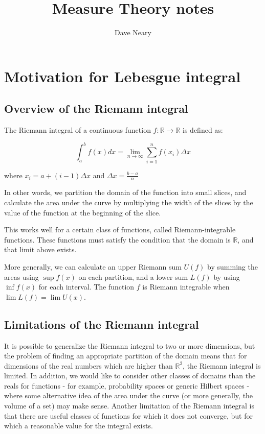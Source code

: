 \documentclass{article}
\begin{document}
\title{Measure Theory notes}
\author{Dave Neary}

\maketitle

\section{Motivation for Lebesgue integral}

\subsection{Overview of the Riemann integral}

The Riemann integral of a continuous function $f:\mathbb{R} \rightarrow \mathbb{R}$ is defined as:

\[ \int_{a}^{b}f(x) dx = \lim_{n \rightarrow \infty}\sum_{i=1}^{n}f(x_{i}) \Delta x \]
 
where $x_{i} = a + (i-1)\Delta x$ and $\Delta x=\frac{b-a}{n}$

In other words, we partition the domain of the function into small slices, 
and calculate the area under the curve by multiplying the width of the slices 
by the value of the function at the beginning of the slice.

This works well for a certain class of functions, called Riemann-integrable
functions. These functions must satisfy the condition that the domain is $\mathbb{R}$,
and that limit above exists.

More generally, we can calculate an upper Riemann sum $U(f)$ by summing the 
areas using $\sup{f(x)}$ on each partition, and a lower sum $L(f)$ by using $\inf{f(x)}$
for each interval. The function $f$ is Riemann integrable when $\lim L(f) = \lim U(x)$. 

\subsection{Limitations of the Riemann integral}

It is possible to generalize the Riemann integral to two
or more dimensions, but the problem of finding an appropriate partition of the domain
means that for dimensions of the real numbers which are higher than $\mathbb{R}^2$,
the Riemann integral is limited.  In addition, we would like to consider other classes
of domains than the reals for functions - for example, probability spaces or generic
Hilbert spaces - where some alternative idea of the area under the curve (or more 
generally, the volume of a set) may make sense. Another limitation of the Riemann
integral is that there are useful classes of functions for which it does not converge,
but for which a reasonable value for the integral exists.
 
\end{document}
